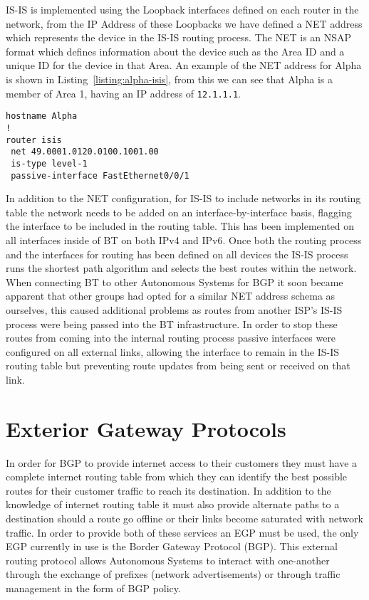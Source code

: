 IS-IS is implemented using the Loopback interfaces defined on each router in the
network, from the IP Address of these Loopbacks we have defined a NET address
which represents the device in the IS-IS routing process. The NET is an NSAP
format which defines information about the device such as the Area ID and a
unique ID for the device in that Area. An example of the NET address for Alpha
is shown in Listing~\ref{listing:alpha-isis}, from this we can see that Alpha is
a member of Area 1, having an IP address of \texttt{12.1.1.1}.

\begin{lstlisting}[caption={Alpha IS-IS Configuration}, label={listing:alpha-isis}]
hostname Alpha
!
router isis
 net 49.0001.0120.0100.1001.00
 is-type level-1
 passive-interface FastEthernet0/0/1
\end{lstlisting}

In addition to the NET configuration, for IS-IS to include networks in its
routing table the network needs to be added on an interface-by-interface basis,
flagging the interface to be included in the routing table. This has been
implemented on all interfaces inside of BT on both IPv4 and IPv6. Once both the
routing process and the interfaces for routing has been defined on all devices
the IS-IS process runs the shortest path algorithm and selects the best routes
within the network. When connecting BT to other Autonomous Systems for BGP it
soon became apparent that other groups had opted for a similar NET address
schema as ourselves, this caused additional problems as routes from another
ISP's IS-IS process were being passed into the BT infrastructure. In order to
stop these routes from coming into the internal routing process passive
interfaces were configured on all external links, allowing the interface to
remain in the IS-IS routing table but preventing route updates from being sent
or received on that link.

\section{Exterior Gateway Protocols} In order for BGP to provide internet access
to their customers they must have a complete internet routing table from which
they can identify the best possible routes for their customer traffic to reach
its destination. In addition to the knowledge of internet routing table it must
also provide alternate paths to a destination should a route go offline or their
links become saturated with network traffic. In order to provide both of these
services an EGP must be used, the only EGP currently in use is the Border
Gateway Protocol (BGP). This external routing protocol allows Autonomous Systems
to interact with one-another through the exchange of prefixes (network
advertisements) or through traffic management in the form of BGP policy.

